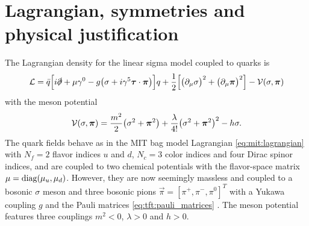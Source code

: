 \section{Lagrangian, symmetries and physical justification}

The Lagrangian density for the linear sigma model coupled to quarks is \cite{ref:jo_lsm_consistent_physical}
\begin{equation}
	\mathcal{L} = \bar{q} \Big[ i \slashed\partial + \mu \gamma^0 - g \big( \sigma + i \gamma^5 {\bm{\tau}} \cdot {\bm{\pi}} \big) \Big] q
	      + \frac12 \Big[ \big( \partial_\mu \sigma \big)^2 + \big( \partial_\mu {\bm{\pi}} \big)^2 \Big] - \mathcal{V}(\sigma,{\bm{\pi}})
\label{eq:lsm:lagrangian}
\end{equation}
with the meson potential
\begin{equation}
	\mathcal{V}(\sigma, {\bm{\pi}}) = \frac{m^2}{2} \big( \sigma^2 + {\bm{\pi}}^2 \big) + \frac{\lambda}{4!} \big( \sigma^2 + {\bm{\pi}}^2 \big)^2 - h \sigma .
\label{eq:lsm:potential}
\end{equation}
The quark fields behave as in the MIT bag model Lagrangian \eqref{eq:mit:lagrangian} with $N_f=2$ flavor indices $u$ and $d$, $N_c=3$ color indices and four Dirac spinor indices, and are coupled to two chemical potentials with the flavor-space matrix $\mu = \operatorname{diag} (\mu_u, \mu_d)$.
However, they are now seemingly massless and coupled to a bosonic $\sigma$ meson and three bosonic pions $\vec\pi = [\pi^+, \pi^-, \pi^0]^T$ with a Yukawa coupling $g$ and the Pauli matrices \eqref{eq:tft:pauli_matrices} .
The meson potential features three couplings $m^2<0$, $\lambda>0$ and $h>0$.

